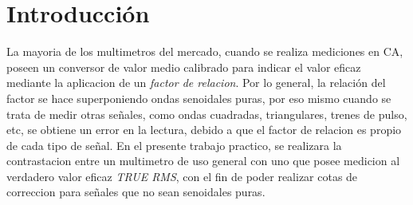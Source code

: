   \section{Introducción}
    La mayoria de los multimetros del mercado, cuando se realiza mediciones
    en CA, poseen un conversor de valor medio calibrado para indicar el 
    valor eficaz mediante la aplicacion de un \textit{factor de relacion}. 
    Por lo general, la relación del factor se hace superponiendo ondas 
    senoidales puras, por eso mismo cuando se trata de medir otras señales, 
    como ondas cuadradas, triangulares, trenes de pulso, etc,
    se obtiene un error en la lectura, debido a que el factor de relacion 
    es propio de cada tipo de señal. En el presente trabajo practico, 
    se realizara la contrastacion entre un multimetro de uso general con uno
    que posee medicion al verdadero valor eficaz \textit{TRUE RMS}, con el 
    fin de poder realizar cotas de correccion para señales que no sean 
    senoidales puras. 
       
